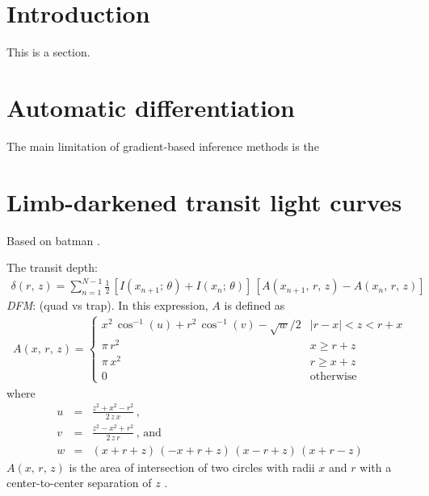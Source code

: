 \documentclass[modern]{aastex62}
\newcommand{\project}[1]{\textsf{#1}}
\newcommand{\todo}[3]{{\color{#2}\emph{#1}: #3}}
\newcommand{\dfmtodo}[1]{\todo{DFM}{red}{#1}}
\begin{document}
\section{Introduction}

This is a section.

\section{Automatic differentiation}

The main limitation of gradient-based inference methods is the

\section{Limb-darkened transit light curves}

Based on \project{batman} \citep{Kreidberg:2015}.

The transit depth:
\begin{eqnarray}
\delta(r,\,z) = \sum_{n=1}^{N-1} \frac{1}{2}\,\left[I(x_{n+1};\,\theta) +
I(x_n;\,\theta)\right]\,
\left[A(x_{n+1},\,r,\,z) - A(x_n,\,r,\,z)\right]
\end{eqnarray}
\dfmtodo{(quad vs trap)}.
In this expression, $A$ is defined as
\begin{eqnarray}
A(x,\,r,\,z) = \left\{\begin{array}{ll}
x^2\,\cos^{-1}(u)+r^2\,\cos^{-1}(v)-\sqrt{w}/2 &
    \left|r-x\right| < z < r + x \\
\pi\,r^2 & x \ge r + z \\
\pi\,x^2 & r \ge x + z \\
0 & \mathrm{otherwise}
\end{array}\right.
\end{eqnarray}
where
\begin{eqnarray}
u &=& \frac{z^2+x^2-r^2}{2\,z\,x} \,,\\
v &=& \frac{z^2-x^2+r^2}{2\,z\,r} \,,\,\mathrm{and}\\
w &=& (x+r+z)\,(-x+r+z)\,(x-r+z)\,(x+r-z)
\end{eqnarray}
$A(x,\,r,\,z)$ is the area of intersection of two circles with radii $x$ and
$r$ with a center-to-center separation of $z$ \citep{Mandel:2002,
Kreidberg:2015}.
\end{document}
